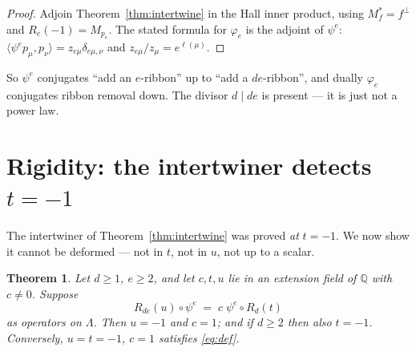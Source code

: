 \documentclass[11pt]{article}
\newtheorem{theorem}{Theorem}
\theoremstyle{definition}
\newcommand{\Q}{\mathbb{Q}}
\newcommand{\Lam}{\Lambda}
\newcommand{\Mult}[1]{M_{#1}}
\begin{document}
\begin{proof}
Adjoin Theorem~\ref{thm:intertwine} in the Hall inner product, using $\Mult{f}^{*}=f^{\perp}$
and $R_{e}(-1)=\Mult{p_e}$.  The stated formula for $\varphi_e$ is the adjoint of
$\psi^{e}$: $\langle\psi^{e}p_\mu,p_\nu\rangle=z_{e\mu}\delta_{e\mu,\nu}$ and
$z_{e\mu}/z_\mu=e^{\ell(\mu)}$.
\end{proof}

So $\psi^{e}$ conjugates ``add an $e$-ribbon'' up to ``add a $de$-ribbon'', and dually
$\varphi_e$ conjugates ribbon removal down.  The divisor $d\mid de$ is present --- it is just
not a power law.

\section{Rigidity: the intertwiner detects $t=-1$}\label{sec:rigid}

The intertwiner of Theorem~\ref{thm:intertwine} was proved \emph{at} $t=-1$.  We now show it
cannot be deformed --- not in $t$, not in $u$, not up to a scalar.

\begin{theorem}\label{thm:rigid}
Let $d\ge1$, $e\ge2$, and let $c,t,u$ lie in an extension field of $\Q$ with $c\neq0$.
Suppose
\begin{equation}\label{eq:def}
  R_{de}(u)\circ\psi^{e}\;=\;c\;\psi^{e}\circ R_{d}(t)
\end{equation}
as operators on $\Lam$.  Then $u=-1$ and $c=1$; and if $d\ge2$ then also $t=-1$.
Conversely, $u=t=-1$, $c=1$ satisfies \eqref{eq:def}.
\end{theorem}
\end{document}
